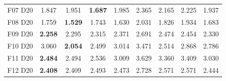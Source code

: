 \begin{table}[!t]
{\begin{tabular}{lcccccccc}
F07 D20 & 1.847 & 1.951 & \textbf{1.687} & 1.985 & 2.365 & 2.165 & 2.225 & 1.937 \\
F08 D20 & 1.759 & \textbf{1.529} & 1.743 & 1.630 & 2.031 & 1.826 & 1.934 & 1.683 \\
F09 D20 & \textbf{2.258} & 2.295 & 2.315 & 2.371 & 2.691 & 2.474 & 2.454 & 2.330 \\
F10 D20 & 3.060 & \textbf{2.054} & 2.499 & 3.014 & 3.471 & 2.514 & 2.868 & 2.786 \\
F11 D20 & \textbf{2.484} & 2.494 & 2.536 & 3.009 & 3.629 & 3.360 & 3.409 & 3.030 \\
F12 D20 & \textbf{2.408} & 2.409 & 2.493 & 2.473 & 2.728 & 2.571 & 2.571 & 2.444 \\
\bottomrule
\end{tabular}%
}
\end{table}
